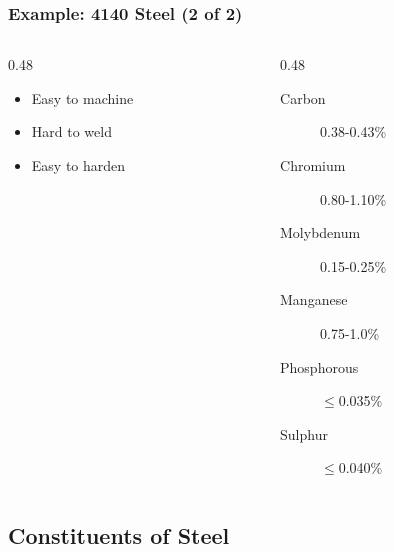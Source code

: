 \begin{frame}
	\frametitle{Example: 4140 Steel (2 of 2)}

    \begin{columns}[t]
        \begin{column}{0.48\linewidth}
            \begin{itemize}[<+- | alert@+>]
                \item Easy to machine
                \item Hard to weld
                \item Easy to harden
            \end{itemize}
        \end{column}
        \begin{column}{0.48\linewidth}
            \begin{description}
                \item[Carbon] 0.38-0.43\%
                \item[Chromium] 0.80-1.10\%
                \item[Molybdenum] 0.15-0.25\%
                \item[Manganese] 0.75-1.0\%
                \item[Phosphorous] $\leq$0.035\%
                \item[Sulphur] $\leq$0.040\%
            \end{description}
        \end{column}
    \end{columns}
\end{frame}

\subsection{Constituents of Steel}

